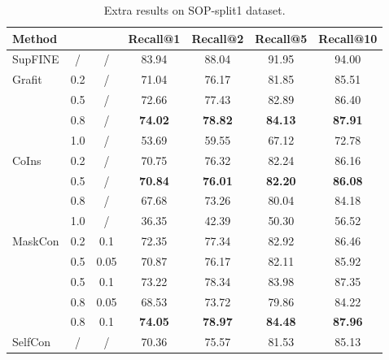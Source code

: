 \documentclass[10pt,twocolumn,letterpaper]{article}
\begin{document}
\begin{table}[htbp]
\centering
\begin{tabular}{@{}l|c|c|cccc@{}}
\toprule
Method                  &  &  & Recall@1       & Recall@2       & Recall@5       & Recall@10      \\ \midrule
SupFINE                 & /   & /      & 83.94          & 88.04          & 91.95          & 94.00          \\ \midrule
\multirow{4}{*}{Grafit} & 0.2 & /      & 71.04          & 76.17          & 81.85          & 85.51          \\
                        & 0.5 & /      & 72.66          & 77.43          & 82.89          & 86.40          \\
                        & 0.8 & /      & \textbf{74.02} & \textbf{78.82} & \textbf{84.13} & \textbf{87.91} \\
                        & 1.0 & /      & 53.69          & 59.55          & 67.12          & 72.78          \\ \midrule
\multirow{4}{*}{CoIns}  & 0.2 & /      & 70.75          & 76.32          & 82.24          & 86.16          \\
                        & 0.5 & /      & \textbf{70.84} & \textbf{76.01} & \textbf{82.20} & \textbf{86.08} \\
                        & 0.8 & /      & 67.68          & 73.26          & 80.04          & 84.18          \\
                        & 1.0 & /      & 36.35          & 42.39          & 50.30          & 56.52          \\ \midrule
MaskCon                 & 0.2 & 0.1    & 72.35          & 77.34          & 82.92          & 86.46          \\
                        & 0.5 & 0.05   & 70.87          & 76.17          & 82.11          & 85.92          \\
                        & 0.5 & 0.1    & 73.22          & 78.34          & 83.98          & 87.35          \\
                        & 0.8 & 0.05   & 68.53          & 73.72          & 79.86          & 84.22          \\
                        & 0.8 & 0.1    & \textbf{74.05} & \textbf{78.97} & \textbf{84.48} & \textbf{87.96} \\ \midrule
SelfCon                 & /   & /      & 70.36          & 75.57          & 81.53          & 85.13          \\ \bottomrule
\end{tabular}
\caption{Extra results on SOP-split1 dataset.}
\label{tab:sop-split1}
\end{table}
\end{document}
